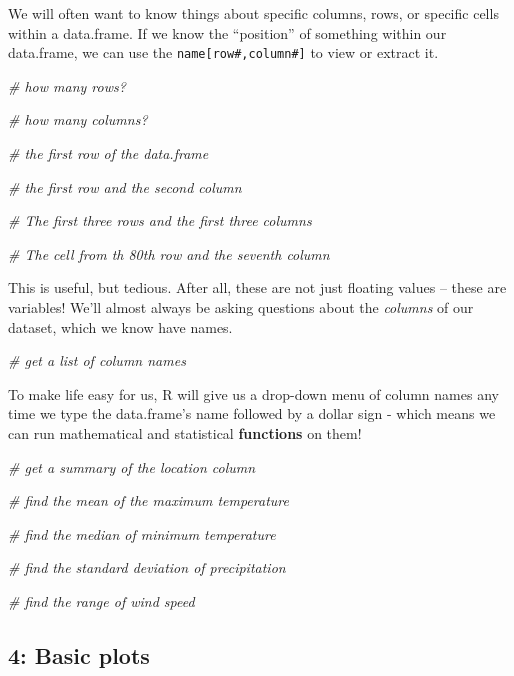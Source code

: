\documentclass[
]{article}
\newenvironment{Shaded}{\begin{snugshade}}{\end{snugshade}}
\newcommand{\CommentTok}[1]{\textcolor[rgb]{0.56,0.35,0.01}{\textit{#1}}}
\begin{document}
We will often want to know things about specific columns, rows, or
specific cells within a data.frame. If we know the ``position'' of
something within our data.frame, we can use the
\texttt{name{[}row\#,column\#{]}} to view or extract it.

\begin{Shaded}
\begin{Highlighting}[]
\CommentTok{\# how many rows?}

\CommentTok{\# how many columns?}

\CommentTok{\# the first row of the data.frame}

\CommentTok{\# the first row and the second column}

\CommentTok{\# The first three rows and the first three columns}

\CommentTok{\# The cell from th 80th row and the seventh column}
\end{Highlighting}
\end{Shaded}

This is useful, but tedious. After all, these are not just floating
values -- these are variables! We'll almost always be asking questions
about the \emph{columns} of our dataset, which we know have names.

\begin{Shaded}
\begin{Highlighting}[]
\CommentTok{\# get a list of column names}
\end{Highlighting}
\end{Shaded}

To make life easy for us, R will give us a drop-down menu of column
names any time we type the data.frame's name followed by a dollar sign -
which means we can run mathematical and statistical \textbf{functions}
on them!

\begin{Shaded}
\begin{Highlighting}[]
\CommentTok{\# get a summary of the location column}

\CommentTok{\# find the mean of the maximum temperature}

\CommentTok{\# find the median of minimum temperature}

\CommentTok{\# find the standard deviation of precipitation}

\CommentTok{\# find the range of wind speed}
\end{Highlighting}
\end{Shaded}

\subsection{4: Basic plots}\label{basic-plots}
\end{document}
